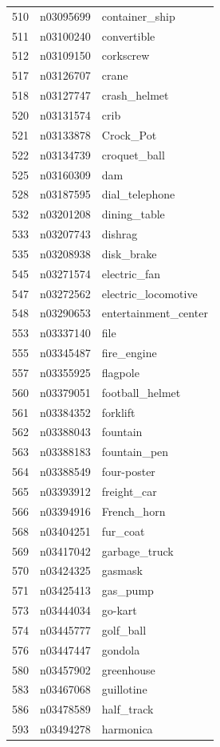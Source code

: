 \begin{table}
\begin{tabular}{cll}
510 & n03095699 & container_ship \\
511 & n03100240 & convertible \\
512 & n03109150 & corkscrew \\
517 & n03126707 & crane \\
518 & n03127747 & crash_helmet \\
520 & n03131574 & crib \\
521 & n03133878 & Crock_Pot \\
522 & n03134739 & croquet_ball \\
525 & n03160309 & dam \\
528 & n03187595 & dial_telephone \\
532 & n03201208 & dining_table \\
533 & n03207743 & dishrag \\
535 & n03208938 & disk_brake \\
545 & n03271574 & electric_fan \\
547 & n03272562 & electric_locomotive \\
548 & n03290653 & entertainment_center \\
553 & n03337140 & file \\
555 & n03345487 & fire_engine \\
557 & n03355925 & flagpole \\
560 & n03379051 & football_helmet \\
561 & n03384352 & forklift \\
562 & n03388043 & fountain \\
563 & n03388183 & fountain_pen \\
564 & n03388549 & four-poster \\
565 & n03393912 & freight_car \\
566 & n03394916 & French_horn \\
568 & n03404251 & fur_coat \\
569 & n03417042 & garbage_truck \\
570 & n03424325 & gasmask \\
571 & n03425413 & gas_pump \\
573 & n03444034 & go-kart \\
574 & n03445777 & golf_ball \\
576 & n03447447 & gondola \\
580 & n03457902 & greenhouse \\
583 & n03467068 & guillotine \\
586 & n03478589 & half_track \\
593 & n03494278 & harmonica \\

\end{tabular}
\end{table}
